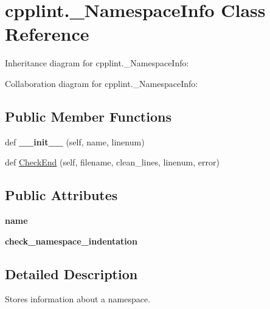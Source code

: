 \hypertarget{classcpplint_1_1__NamespaceInfo}{}\section{cpplint.\+\_\+\+Namespace\+Info Class Reference}
\label{classcpplint_1_1__NamespaceInfo}


Inheritance diagram for cpplint.\+\_\+\+Namespace\+Info\+:


Collaboration diagram for cpplint.\+\_\+\+Namespace\+Info\+:
\subsection*{Public Member Functions}
\begin{DoxyCompactItemize}
\item 
\mbox{\label{classcpplint_1_1__NamespaceInfo_a4425c93bd90fbf869dc31c87302f5bb0}} 
def {\bfseries \+\_\+\+\_\+init\+\_\+\+\_\+} (self, name, linenum)
\item 
def \hyperlink{classcpplint_1_1__NamespaceInfo_a9d3abaeed0353942ca689eeeb2f2924b}{Check\+End} (self, filename, clean\+\_\+lines, linenum, error)
\end{DoxyCompactItemize}
\subsection*{Public Attributes}
\begin{DoxyCompactItemize}
\item 
\mbox{\label{classcpplint_1_1__NamespaceInfo_a6b518dae822e4e440405654e83dc86a1}} 
{\bfseries name}
\item 
\mbox{\label{classcpplint_1_1__NamespaceInfo_ae0b0b6ffafd3336a93cddca1078df268}} 
{\bfseries check\+\_\+namespace\+\_\+indentation}
\end{DoxyCompactItemize}


\subsection{Detailed Description}
\begin{DoxyVerb}Stores information about a namespace.\end{DoxyVerb}
 

